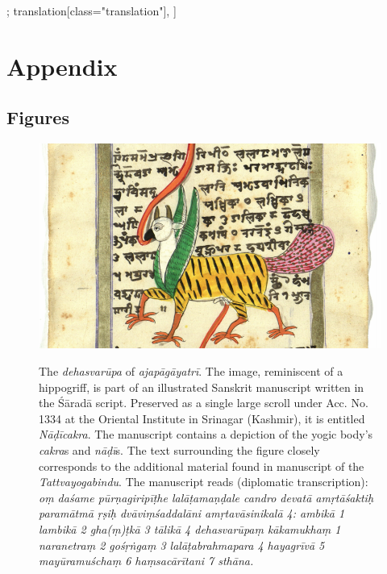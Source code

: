 \begin{alignment}[
  texts=edition[class="edition"];
  translation[class="translation"],
  ]
\begin{translation}
\begin{tlate}[p38_01]
  \flushpage
  \end{tlate}
  \end{translation}
\end{alignment}
\pagebreak %
\cleardoublepage
{}
\chapter{Appendix}
\section{Figures}
 
\clearpage

  \begin{figure}[ht]
	\centering
  \includegraphics[width=1\textwidth]{pics/Wolpertinger.png}
\caption[The \textit{dehasvarūpa} of \textit{ajapāgāyatrī}]{The \textit{dehasvarūpa} of \textit{ajapāgāyatrī}. The image, reminiscent of a hippogriff, is part of an illustrated Sanskrit manuscript written in the Śāradā script. Preserved as a single large scroll under Acc. No. 1334 at the Oriental Institute in Srinagar (Kashmir), it is entitled \textit{Nāḍīcakra}. The manuscript contains a depiction of the yogic body’s \textit{cakra}s and \textit{nāḍī}s. The text surrounding the figure closely corresponds to the additional material found in manuscript  of the \textit{Tattvayogabindu}. The manuscript reads (diplomatic transcription): \textit{oṃ daśame pūrṇagiripīṭhe lalāṭamaṇḍale candro devatā amṛtāśaktiḥ paramātmā ṛṣiḥ dvāviṃśaddalāni amṛtavāsinikalā 4: ambikā 1 lambikā 2 gha(ṃ)ṭkā 3 tālikā 4 dehasvarūpaṃ kākamukhaṃ 1 naranetraṃ 2 gośṛṅgaṃ 3 lalāṭabrahmapara 4 hayagrīvā 5 mayūramuśchaṃ 6 haṃsacārītani 7 sthāna.}}
	\label{fig_wolpertinger}
      \end{figure}

